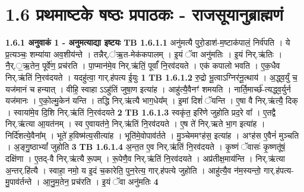 \documentclass[17pt]{extarticle}
\begin{document}
     \section*{ 1.6     प्रथमाष्टके षष्ठः प्रपाठकः - राजसूयानुब्राह्मणं }
                \textbf{ 1.6.1     अनुवाकं   1 - अनुमत्याद्या इष्टयः} \newline
                                \textbf{ TB 1.6.1.1} \newline
                  अनु॑मत्यै पुरो॒डाश॑-म॒ष्टाक॑पालं॒ निर्व॑पति । ये प्र॒त्यञ्चः॒ शम्या॑या अव॒शीय॑न्ते । तन्नैर्.॑ऋ॒त-मेक॑कपालम् । इ॒यं ॅवा अनु॑मतिः । इ॒यं निर्.ऋ॑तिः । नै॒र्.॒ऋ॒तेन॒ पूर्वे॑ण॒ प्रच॑रति । पा॒प्मान॑मे॒व निर्.ऋ॑तिं॒ पूर्वां᳚ नि॒रव॑दयते । एक॑ कपालो भवति । ए॒क॒धैव निर्.ऋ॑तिं नि॒रव॑दयते । यदहु॑त्वा॒ गार्.ह॑पत्य ई॒युः \textbf{ 1} \newline
                  \newline
                                \textbf{ TB 1.6.1.2} \newline
                  रु॒द्रो भू॒त्वाऽग्निर॑नू॒त्थाय॑ । अ॒द्ध्व॒र्युं च॒ यज॑मानं च हन्यात् । वीहि॒ स्वाहा ऽऽहु॑तिं जुषा॒ण इत्या॑ह । आहु॑त्यै॒वैनꣳ॑ शमयति । नार्ति॒मार्च्छ॑-त्यद्ध्व॒र्युर्न यज॑मानः । ए॒को॒ल्मु॒केन॑ यन्ति । तद्धि निर्.ऋ॑त्यै भाग॒धेय᳚म् । इ॒मां दिशं॑ ॅयन्ति । ए॒षा वै निर्.ऋ॑त्यै॒ दिक् । स्वाया॑मे॒व दि॒शि निर्.ऋ॑तिं नि॒रव॑दयते \textbf{ 2} \newline
                  \newline
                                \textbf{ TB 1.6.1.3} \newline
                  स्वकृ॑त॒ इरि॑णे जुहोति प्रद॒रे वा᳚ । ए॒तद्वै निर्.ऋ॑त्या आ॒यत॑नम् । स्व ए॒वायत॑ने॒ निर्.ऋ॑तिं नि॒रव॑दयते । ए॒ष ते॑ निर्.ऋते भा॒ग इत्या॑ह । निर्दि॑शत्ये॒वैना᳚म् । भूते॑ ह॒विष्म॑त्य॒सीत्या॑ह । भूति॑मे॒वोपाव॑र्तते । मु॒ञ्चेममꣳह॑स॒ इत्या॑ह । अꣳह॑स ए॒वैनं॑ मुञ्चति । अ॒ङ्गु॒ष्ठाभ्यां᳚ जुहोति \textbf{ 3} \newline
                  \newline
                                \textbf{ TB 1.6.1.4} \newline
                  अ॒न्त॒त ए॒व निर्.ऋ॑तिं नि॒रव॑दयते । कृ॒ष्णं ॅवासः॑ कृ॒ष्णतू॑षं॒ दक्षि॑णा । ए॒तद्-वै निर्.ऋ॑त्यै रू॒पम् । रू॒पेणै॒व निर्.ऋ॑तिं नि॒रव॑दयते । अप्र॑तीक्ष॒माय॑न्ति । निर्.ऋ॑त्या अ॒न्तर्.हि॑त्यै । स्वाहा॒ नमो॒ य इ॒दं च॒कारेति॒ पुन॒रेत्य॒ गार्.ह॑पत्ये जुहोति । आहु॑त्यै॒व न॑म॒स्यन्तो॒ गार्.ह॑पत्य-मु॒पाव॑र्तन्ते । आ॒नु॒म॒तेन॒ प्रच॑रति । इ॒यं ॅवा अनु॑मतिः \textbf{ 4} \newline
                  \newline
\end{document}
